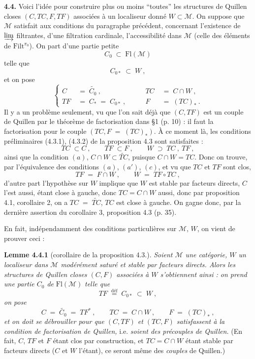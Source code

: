 \documentclass[11pt]{article}
\newcommand{\printedpage}[1]{\marginpar{\footnotesize p.~#1}}
\newcommand{\msp}[1]{\marginpar{\footnotesize [#1]}}
\newcommand{\Fl}{\mathrm{Fl}}
\newcommand{\deq}{\overset{\text{déf}}{=}}
\begin{document}
\textbf{4.4.} Voici l'idée pour construire plus ou moins “toutes” les structures de Quillen closes $(C,TC,F,TF)$ associées à un localiseur donné $W\subset\mathcal{M}$. On suppose que $\mathcal{M}$ satisfait aux conditions du paragraphe précédent, concernant l'existence de $\varinjlim$ filtrantes, d'une filtration cardinale, l'accessibilité dans $\mathcal{M}$ (celle des éléments de $\mathrm{Filt}^{\pi_0}$). On part d'une partie petite
\[
C_0\;\subset\;\Fl(\mathcal{M})
\]
telle que
\[
C_{0*}\;\subset\;W\ , \tag*{(4.4.1)}
\]
et on pose
\[
\left\{
\begin{aligned}
C &\;=\;\widetilde{C_0}\ , &\qquad TC &\;=\;C\cap W\ ,\\
TF &\;=\;C_*\;=\;C_{0*}\ , &\qquad F &\;=\;(TC)_*\ .
\end{aligned}
\right.
\tag*{(4.4.2)}
\]
Il y a un problème seulement, vu que l'on sait déjà que $(C,TF)$ est un couple de Quillen par le théorème de factorisation dans §1 (p. 10) : il faut la factorisation pour le couple $(TC,F\;=\;(TC)_*)$. À ce moment là, les conditions préliminaires (4.3.1), (4.3.2) de la proposition 4.3 sont satisfaites :
\[
TC\;\subset C\ ,\qquad TF\;\subset F\ ,\qquad W\;\supset\;TC\ ,\ TF\ ,
\]
ainsi que la condition $(a)$, $C\cap W\subset\widetilde{TC}$, puisque $C\cap W=TC$. Donc on trouve, par l'équivalence des conditions $(a)$, $(a')$, $(c)$, et vu que $TC$ et $TF$ sont clos,
\[
TF\;=\;F\cap W\ ,\qquad W\;=\;TF\circ TC\ ,
\]
\printedpage{26}
\msp{page 38}
d'autre part l'hypothèse sur $W$ implique que $W$ est stable par facteurs directs, $C$ l'est aussi, étant close à gauche, donc $TC=C{\cap}W$ aussi, donc par proposition 4.1, corollaire 2, on a $TC\;=\;\widetilde{TC}$, $TC$ est close à gauche. On gagne donc, par la dernière assertion du corollaire 3, proposition 4.3 (p. 35).

En fait, indépendamment des conditions particulières sur $\mathcal{M}$, $W$, on vient de prouver ceci :

\textbf{Lemme 4.4.1} (corollaire de la proposition 4.3.). \textit{Soient $\mathcal{M}$ une catégorie, $W$ un localiseur dans $\mathcal{M}$ modérément saturé et stable par facteurs directs. Alors les structures de Quillen closes $(C,F)$ associées à $W$ s'obtiennent ainsi : on prend une partie $C_0$ de} $\Fl(\mathcal{M})$ \textit{telle que}
\[
TF\;\deq\;C_{0*}\;\subset\;W\ ,
\]
\textit{on pose}
\[
C\;=\;\widetilde{C_0}\;=\;TF^*\ ,\qquad TC\;=\;C\cap W\ ,\qquad F\;=\;(TC)_*\ ,
\]
\textit{et on doit se débrouiller pour que $(C,TF)$ et $(TC,F)$ satisfassent à la condition de factorisation de Quillen,} i.e. \textit{soient des précouples de Quillen.} (En fait, $C$, $TF$ et $F$ étant clos par construction, et $TC=C\cap W$ étant stable par facteurs directs ($C$ et $W$ l'étant), ce seront même des \textit{couples} de Quillen.)
\end{document}
